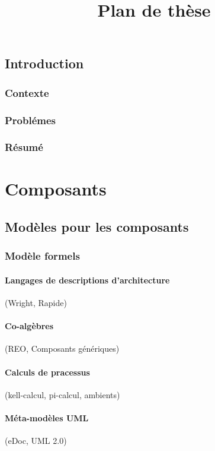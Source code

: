 \documentclass[french,a4paper,leqno,twoside]{book}
\title{Plan de th\`ese}
\begin{document}
\nopagebreak
\maketitle

\chapter{Introduction}
\section{Contexte}
\section{Probl\'emes}
\section{R\'esum\'e}

\part{Composants}

\chapter{Mod\`eles pour les composants}

\section{Mod\`ele formels}

\subsection{Langages de descriptions d'architecture}
 (Wright, Rapide)
\subsection{Co-alg\`ebres}
 (REO, Composants g\'en\'eriques)
\subsection{Calculs de pracessus}
 (kell-calcul, pi-calcul, ambients)
\subsection{M\'eta-mod\`eles UML}
 (eDoc, UML 2.0)
\end{document}
